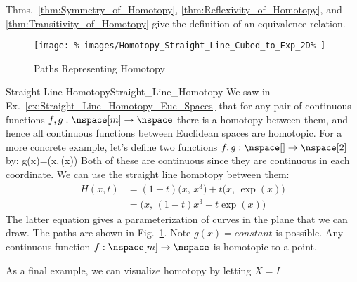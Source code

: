 \documentclass{book}                                                           %
\begin{document}
                Thms.~\ref{thm:Symmetry_of_Homotopy},
                \ref{thm:Reflexivity_of_Homotopy}, and
                \ref{thm:Transitivity_of_Homotopy} give the definition of an
                equivalence relation.
                \begin{figure}[H]
                    \centering
                    \captionsetup{type=figure}
                    \texttt{[image: \%
                        images/Homotopy\_Straight\_Line\_Cubed\_to\_Exp\_2D\%
                    ]}
                    \caption{Paths Representing Homotopy}
                    \label{fig:Paths_Representing_Homotopy}
                \end{figure}
                \begin{lexample}{Straight Line Homotopy}{Straight_Line_Homotopy}
                    We saw in Ex.~\ref{ex:Straight_Line_Homotopy_Euc_Spaces}
                    that for any pair of continuous functions
                    $f,g:\nspace[m]\rightarrow\nspace$ there is a homotopy
                    between them, and hence all continuous functions between
                    Euclidean spaces are homotopic. For a more concrete example,
                    let's define two functions
                    $f,g:\nspace[]\rightarrow\nspace[2]$ by:
                                {g(x)=\big(x,\,\exp(x)\big)}
                    Both of these are continuous since they are continuous in
                    each coordinate. We can use the straight line homotopy
                    between them:
                    \begin{subequations}
                        \begin{align}
                            H(x,t)
                            &=(1-t)\big(x,\,x^{3}\big)+t\big(x,\,\exp(x)\big)\\
                            &=\big(x,\,(1-t)x^{3}+t\exp(x)\big)
                        \end{align}
                    \end{subequations}
                    The latter equation gives a parameterization of curves in
                    the plane that we can draw. The paths are shown in
                    Fig.~\ref{fig:Paths_Representing_Homotopy}. Note
                    $g(x)=constant$ is possible. Any continuous function
                    $f:\nspace[m]\rightarrow\nspace$ is homotopic to a point.
                \end{lexample}
                As a final example, we can visualize homotopy by letting $X=I$
\end{document}
